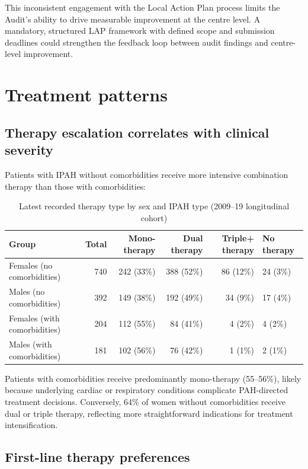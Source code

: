 \documentclass[11pt,a4paper]{article}
\begin{document}
This inconsistent engagement with the Local Action Plan process limits the Audit's ability to drive measurable improvement at the centre level. A mandatory, structured LAP framework with defined scope and submission deadlines could strengthen the feedback loop between audit findings and centre-level improvement.

\section{Treatment patterns}

\subsection{Therapy escalation correlates with clinical severity}

Patients with IPAH without comorbidities receive more intensive combination therapy than those with comorbidities:

\begin{table}[H]
\centering
\small
\caption{Latest recorded therapy type by sex and IPAH type (2009--19 longitudinal cohort)}
\begin{tabularx}{\textwidth}{lrrrrY}
\toprule
Group & Total & Mono-therapy & Dual therapy & Triple+ therapy & No therapy \\
\midrule
Females (no comorbidities) & 740 & 242 (33\%) & 388 (52\%) & 86 (12\%) & 24 (3\%) \\
Males (no comorbidities) & 392 & 149 (38\%) & 192 (49\%) & 34 (9\%) & 17 (4\%) \\
Females (with comorbidities) & 204 & 112 (55\%) & 84 (41\%) & 4 (2\%) & 4 (2\%) \\
Males (with comorbidities) & 181 & 102 (56\%) & 76 (42\%) & 1 (1\%) & 2 (1\%) \\
\bottomrule
\end{tabularx}
\end{table}

Patients with comorbidities receive predominantly mono-therapy (55--56\%), likely because underlying cardiac or respiratory conditions complicate PAH-directed treatment decisions. Conversely, 64\% of women without comorbidities receive dual or triple therapy, reflecting more straightforward indications for treatment intensification.

\subsection{First-line therapy preferences}
\end{document}
